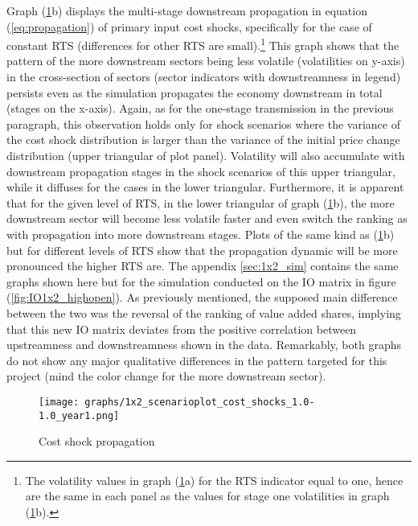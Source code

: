 Graph (\ref{fig:1x2cost_y1}b) displays the multi-stage downstream propagation in equation (\ref{eq:propagation}) of primary input cost shocks, 
specifically for the case of constant RTS (differences for other RTS are small).\footnote{The volatility values in graph (\ref{fig:1x2cost_y1}a) 
for the RTS indicator equal to one, hence are the same in each panel as the values for stage one volatilities in graph (\ref{fig:1x2cost_y1}b).} 
This graph shows that the pattern of the more downstream sectors being less volatile (volatilities on y-axis) in the cross-section of sectors 
(sector indicators with downstreamness in legend) persists even as the simulation propagates the economy downstream in total (stages 
on the x-axis). Again, as for the one-stage transmission in the previous paragraph, this observation holds only for shock scenarios
where the variance of the cost shock distribution is larger than the variance of the initial price change 
distribution (upper triangular of plot panel). Volatility will also accumulate with downstream propagation stages in the shock scenarios of this 
upper triangular, while it diffuses for the cases in the lower triangular. Furthermore, it is apparent that for the given level 
of RTS, in the lower triangular of graph (\ref{fig:1x2cost_y1}b), the more downstream sector will become less volatile faster and 
even switch the ranking as with propagation into more downstream stages. Plots of the same kind as (\ref{fig:1x2cost_y1}b) but 
for different levels of RTS show that the propagation dynamic will be more pronounced the higher RTS are. The appendix \ref{sec:1x2_sim}
contains the same graphs shown here but for the simulation conducted on the IO matrix in figure (\ref{fig:IO1x2_highopen}). As previously
mentioned, the supposed main difference between the two was the reversal of the ranking of value added shares, implying that this
new IO matrix deviates from the positive correlation between upstreamness and downstreamness shown in the data. Remarkably, both graphs 
do not show any major qualitative differences in the pattern targeted for this project (mind the color change for the more downstream 
sector). 

\begin{figure}[H]
    \texttt{[image: graphs/1x2\_scenarioplot\_cost\_shocks\_1.0-1.0\_year1.png]}
    \caption{\label{fig:1x2cost_y1} Cost shock propagation}
\end{figure}

